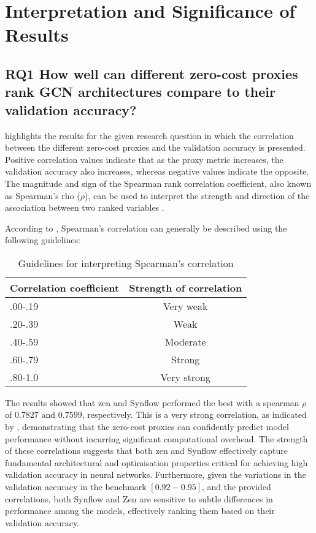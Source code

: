 \section{Interpretation and Significance of Results}

\subsection{RQ1 How well can different zero-cost proxies rank GCN architectures compare to their validation accuracy?}

 highlights the results for the given research question in which the correlation between the different zero-cost proxies and the validation accuracy is presented. Positive correlation values indicate that as the proxy metric increases, the validation accuracy also increases, whereas negative values indicate the opposite. The magnitude and sign of the Spearman rank correlation coefficient, also known as Spearman's rho (\(\rho\)), can be used to interpret the strength and direction of the association between two ranked variables \autocite{pallant2016spss}.

According to \cite{spear}, Spearman's correlation can generally be described using the following guidelines:

\begin{table}[h]
\caption{Guidelines for interpreting Spearman's correlation}
\centering
\begin{tabular}{lc}
\textbf{Correlation coefficient} & \textbf{Strength of correlation} \\ \hline
\multicolumn{1}{l|}{.00-.19} & Very weak \\
\multicolumn{1}{l|}{\cellcolor{verylightgray}.20-.39} & \cellcolor{verylightgray}Weak \\
\multicolumn{1}{l|}{.40-.59} & Moderate \\
\multicolumn{1}{l|}{\cellcolor{verylightgray}.60-.79} & \cellcolor{verylightgray}Strong \\
\multicolumn{1}{l|}{.80-1.0} & Very strong \\
\end{tabular}
\label{tab:correlation}
\end{table}

The results showed that zen and \gls{Synflow} performed the best with a spearman $\rho$ of $0.7827$ and $0.7599$, respectively. This is a very strong correlation, as indicated by \cite{spear}, demonstrating that the zero-cost proxies can confidently predict model performance without incurring significant computational overhead. The strength of these correlations suggests that both zen and \gls{Synflow} effectively capture fundamental architectural and optimisation properties critical for achieving high validation accuracy in neural networks. Furthermore, given the variations in the validation accuracy in the benchmark $[0.92 - 0.95]$, and the provided correlations, both \gls{Synflow} and Zen are sensitive to subtle differences in performance among the models, effectively ranking them based on their validation accuracy. 

